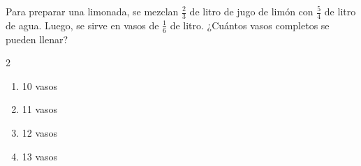 Para preparar una limonada, se mezclan $\frac{2}{3}$ de litro de jugo de limón con $\frac{5}{4}$ de litro de agua. Luego, se sirve en vasos de $\frac{1}{6}$ de litro. ¿Cuántos vasos completos se pueden llenar?
\begin{multicols}{2}
\begin{enumerate}[label=\alph*)]
\item 10 vasos
\item 11 vasos
\item 12 vasos
\item 13 vasos
\end{enumerate}
\end{multicols}
